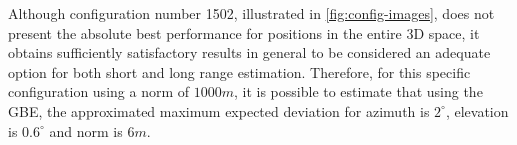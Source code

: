 Although configuration number 1502, illustrated in \ref{fig:config-images}, does not present the absolute best performance for positions in the entire 3D space, it obtains sufficiently satisfactory results in general to be considered an adequate option for both short and long range estimation. Therefore, for this specific configuration using a norm of $1000m$, it is possible to estimate that using the GBE, the approximated maximum expected deviation for azimuth is $2^{\circ}$, elevation is $0.6^{\circ}$ and norm is $6m$. 



